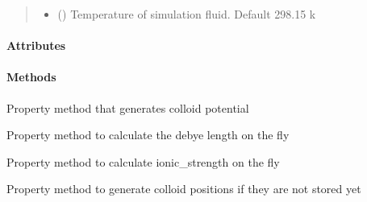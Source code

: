 \documentclass[letterpaper,10pt,english]{sphinxmanual}
\begin{document}
\begin{fulllineitems}
\begin{quote}
\begin{description}
\begin{itemize}
\item {} 
 () \textendash{} Temperature of simulation fluid. Default 298.15 k

\end{itemize}

\end{description}\end{quote}
\paragraph{Attributes}
\paragraph{Methods}

\begin{fulllineitems}
\label{\detokenize{index:lb_colloids.Colloids.Colloid_Math.ColloidColloid.colloid_potential}}
Property method that generates colloid potential

\end{fulllineitems}


\begin{fulllineitems}
\label{\detokenize{index:lb_colloids.Colloids.Colloid_Math.ColloidColloid.debye}}
Property method to calculate the debye length on the fly

\end{fulllineitems}


\begin{fulllineitems}
\label{\detokenize{index:lb_colloids.Colloids.Colloid_Math.ColloidColloid.ionic_strength}}
Property method to calculate ionic\_strength on the fly

\end{fulllineitems}


\begin{fulllineitems}
\label{\detokenize{index:lb_colloids.Colloids.Colloid_Math.ColloidColloid.positions}}
Property method to generate colloid positions if they are not stored yet


\end{fulllineitems}
\end{fulllineitems}
\end{document}
